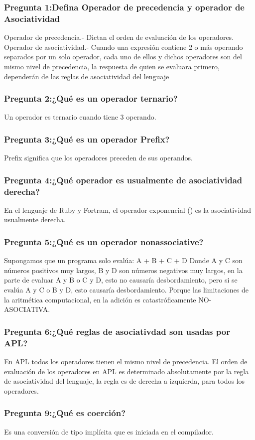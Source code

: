 \subsubsection{Pregunta 1:Defina Operador de precedencia y operador de Asociatividad}
Operador de precedencia.- Dictan el orden de evaluación de los operadores.
Operador de asociatividad.- Cuando una expresión contiene 2 o más operando separados por un solo operador, cada uno de ellos y dichos operadores son del mismo nivel de precedencia, la respuesta de quien se evaluara primero, dependerán de las reglas de asociatividad del lenguaje
\subsubsection{Pregunta 2:¿Qué es un operador ternario?}
Un operador es ternario cuando tiene 3 operando.
\subsubsection{Pregunta 3:¿Qué es un operador Prefix?}
Prefix significa que los operadores preceden de sus operandos.
\subsubsection{Pregunta 4:¿Qué operador es usualmente de asociatividad derecha?}
En el lenguaje de Ruby y Fortram, el operador exponencial (\*\*) es la asociatividad usualmente derecha.
\subsubsection{Pregunta 5:¿Qué es un operador nonassociative?}
Supongamos que un programa solo evalúa:
A + B + C + D
Donde A y C son números positivos muy largos, B y D son números negativos muy largos, en la parte de evaluar A y B o C y D, esto no causaría desbordamiento, pero si se evalúa A y C o B y D, esto causaría desbordamiento. Porque las limitaciones de la aritmética computacional, en la adición es catastróficamente NO-ASOCIATIVA.
\subsubsection{Pregunta 6:¿Qué reglas de asociativdad son usadas por APL?}
En APL todos los operadores tienen el mismo nivel de precedencia. El orden de evaluación de los operadores en APL es determinado absolutamente por la regla de asociatividad del lenguaje, la regla es de derecha a izquierda, para todos los operadores.
\subsubsection{Pregunta 9:¿Qué es coerción?}
Es una conversión de tipo implícita que es iniciada en el compilador.